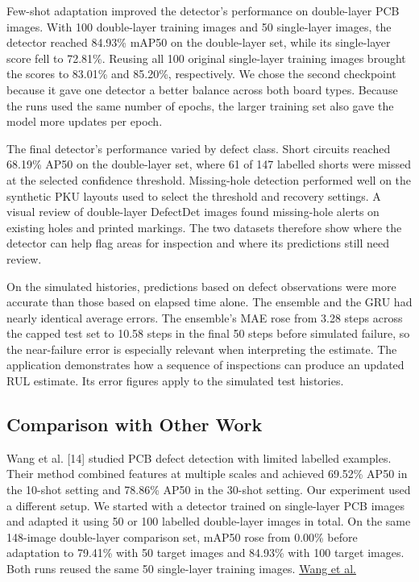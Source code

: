\documentclass[conference]{IEEEtran}
\begin{document}
Few-shot adaptation improved the detector’s performance on double-layer PCB images. With 100 double-layer training images and 50 single-layer images, the detector reached 84.93\% mAP50 on the double-layer set, while its single-layer score fell to 72.81\%. Reusing all 100 original single-layer training images brought the scores to 83.01\% and 85.20\%, respectively. We chose the second checkpoint because it gave one detector a better balance across both board types. Because the runs used the same number of epochs, the larger training set also gave the model more updates per epoch.

The final detector’s performance varied by defect class. Short circuits reached 68.19\% AP50 on the double-layer set, where 61 of 147 labelled shorts were missed at the selected confidence threshold. Missing-hole detection performed well on the synthetic PKU layouts used to select the threshold and recovery settings. A visual review of double-layer DefectDet images found missing-hole alerts on existing holes and printed markings. The two datasets therefore show where the detector can help flag areas for inspection and where its predictions still need review.

On the simulated histories, predictions based on defect observations were more accurate than those based on elapsed time alone. The ensemble and the GRU had nearly identical average errors. The ensemble’s MAE rose from 3.28 steps across the capped test set to 10.58 steps in the final 50 steps before simulated failure, so the near-failure error is especially relevant when interpreting the estimate. The application demonstrates how a sequence of inspections can produce an updated RUL estimate. Its error figures apply to the simulated test histories.

\subsection{Comparison with Other Work}

Wang et al. [14] studied PCB defect detection with limited labelled examples. Their method combined features at multiple scales and achieved 69.52\% AP50 in the 10-shot setting and 78.86\% AP50 in the 30-shot setting. Our experiment used a different setup. We started with a detector trained on single-layer PCB images and adapted it using 50 or 100 labelled double-layer images in total. On the same 148-image double-layer comparison set, mAP50 rose from 0.00\% before adaptation to 79.41\% with 50 target images and 84.93\% with 100 target images. Both runs reused the same 50 single-layer training images. \href{https://doi.org/10.1109/ACCESS.2022.3228392}{Wang et al.}
\end{document}

